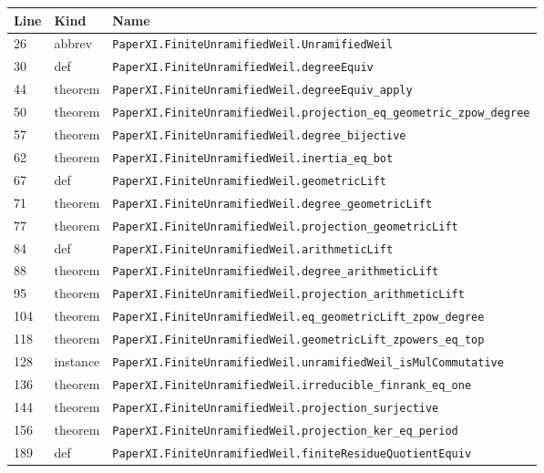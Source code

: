 \documentclass[10pt,oneside]{book}
\begin{document}
\begin{longtable}{@{}p{}p{}p{}@{}}\toprule Line&Kind&Name\\\midrule\endhead

26&abbrev&\nolinkurl{PaperXI.FiniteUnramifiedWeil.UnramifiedWeil}\\

30&def&\nolinkurl{PaperXI.FiniteUnramifiedWeil.degreeEquiv}\\

44&theorem&\nolinkurl{PaperXI.FiniteUnramifiedWeil.degreeEquiv_apply}\\

50&theorem&\nolinkurl{PaperXI.FiniteUnramifiedWeil.projection_eq_geometric_zpow_degree}\\

57&theorem&\nolinkurl{PaperXI.FiniteUnramifiedWeil.degree_bijective}\\

62&theorem&\nolinkurl{PaperXI.FiniteUnramifiedWeil.inertia_eq_bot}\\

67&def&\nolinkurl{PaperXI.FiniteUnramifiedWeil.geometricLift}\\

71&theorem&\nolinkurl{PaperXI.FiniteUnramifiedWeil.degree_geometricLift}\\

77&theorem&\nolinkurl{PaperXI.FiniteUnramifiedWeil.projection_geometricLift}\\

84&def&\nolinkurl{PaperXI.FiniteUnramifiedWeil.arithmeticLift}\\

88&theorem&\nolinkurl{PaperXI.FiniteUnramifiedWeil.degree_arithmeticLift}\\

95&theorem&\nolinkurl{PaperXI.FiniteUnramifiedWeil.projection_arithmeticLift}\\

104&theorem&\nolinkurl{PaperXI.FiniteUnramifiedWeil.eq_geometricLift_zpow_degree}\\

118&theorem&\nolinkurl{PaperXI.FiniteUnramifiedWeil.geometricLift_zpowers_eq_top}\\

128&instance&\nolinkurl{PaperXI.FiniteUnramifiedWeil.unramifiedWeil_isMulCommutative}\\

136&theorem&\nolinkurl{PaperXI.FiniteUnramifiedWeil.irreducible_finrank_eq_one}\\

144&theorem&\nolinkurl{PaperXI.FiniteUnramifiedWeil.projection_surjective}\\

156&theorem&\nolinkurl{PaperXI.FiniteUnramifiedWeil.projection_ker_eq_period}\\

189&def&\nolinkurl{PaperXI.FiniteUnramifiedWeil.finiteResidueQuotientEquiv}\\

\bottomrule\end{longtable}
\end{document}
